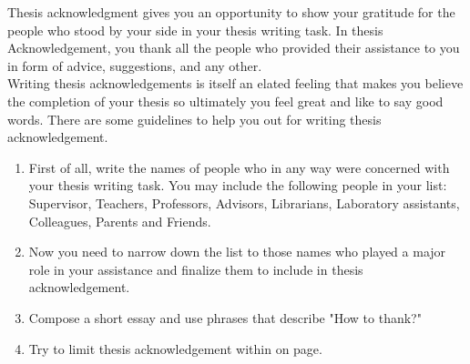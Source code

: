 %

\begin{acknowledgements}			%

Thesis acknowledgment gives you an opportunity to show your gratitude 
for the people who stood by your side in your thesis writing task. 
In thesis Acknowledgement, you thank all the people who provided their 
assistance to you in form of advice, suggestions, and any other.\\

Writing thesis acknowledgements is itself an elated feeling that makes 
you believe the completion of your thesis so ultimately you feel great 
and like to say good words. There are some guidelines to help you out 
for writing thesis acknowledgement. \\

\begin{enumerate}
\item 
First of all, write the names of people who in any way were 
concerned with your thesis writing task. You may include the following 
people in your list: Supervisor, Teachers, Professors, Advisors, Librarians, 
Laboratory assistants, Colleagues, Parents and Friends. 

\item 
Now you need to narrow down the list to those names who played 
a major role in your assistance and finalize them to include in thesis 
acknowledgement.

\item
Compose a short essay and use phrases that describe "How to thank?" 

\item
Try to limit thesis acknowledgement within on page. 
\end{enumerate}


\end{acknowledgements}
